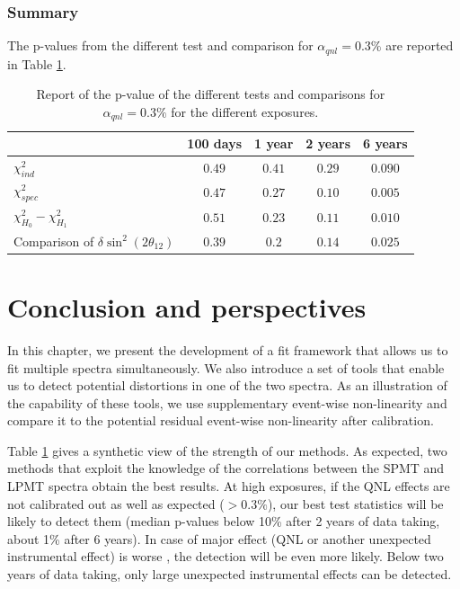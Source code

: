 \documentclass[../main.tex]{subfiles}
\begin{document}
\subsubsection{Summary}

The p-values from the different test and comparison for $\alpha_{qnl} = 0.3\%$ are reported in Table \ref{tab:joint_fit:results:p_value}.
\begin{table}[ht]
  \centering
  \begin{tabular}{l | c | c | c | c}
                                   & 100 days          & 1 year           & 2 years          & 6 years \\
                                   \hline
    $\chi^2_{ind}$                               & $0.49$  & $0.41 $ & $0.29$ & $0.090$ \\
    $\chi^2_{spec}$                              & $0.47$  & $0.27 $ & $\bm{0.10}$ & $\bm{0.005}$ \\
    $\chi^2_{H_0} - \chi^2_{H_1}$                & $0.51$  & $0.23 $ & $\bm{0.11}$ & $\bm{0.010}$ \\
    Comparison of $\delta \sin^2(2 \theta_{12})$ & $0.39$  & $0.2  $ & $0.14$ & $0.025$ \\
  \end{tabular}
  \caption{Report of the p-value of the different tests and comparisons for $\alpha_{qnl} = 0.3\%$ for the different exposures.}
  \label{tab:joint_fit:results:p_value}
\end{table}


%
%
%
%
%

\section{Conclusion and perspectives}
\label{sec:joint_fit:conclusion}

In this chapter, we present the development of a fit framework that allows us to fit multiple spectra simultaneously. We also introduce a set of tools that enable us to detect potential distortions in one of the two spectra. As an illustration of the capability of these tools, we use supplementary event-wise non-linearity and compare it to the potential residual event-wise non-linearity after calibration.

Table \ref{tab:joint_fit:results:p_value} gives a synthetic view of the strength of our methods. As expected, two methods that exploit the knowledge of the correlations between the SPMT and LPMT spectra obtain the best results. At high exposures, if the QNL effects are not calibrated out as well as expected ($>0.3\%$), our best test statistics will be likely to detect them (median p-values below 10\% after 2 years of data taking,  about 1\% after 6 years).
In case of major effect (QNL or another unexpected instrumental effect) is worse , the detection will be even more likely.  Below two years of data taking, only large unexpected instrumental effects can be detected.
\end{document}
